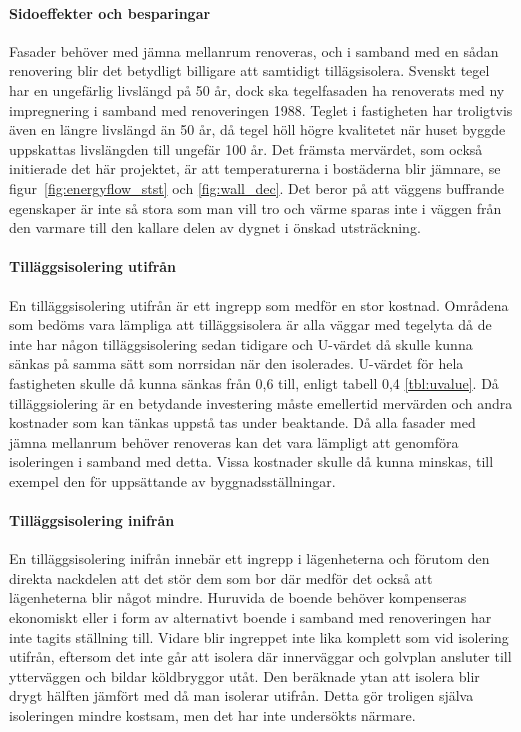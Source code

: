 \paragraph{Sidoeffekter och besparingar}
Fasader behöver med jämna mellanrum renoveras, och i samband med en sådan renovering blir det betydligt billigare att samtidigt tillägsisolera. Svenskt tegel har en ungefärlig livslängd på 50 år\cite{magnus}, dock ska tegelfasaden ha renoverats med ny impregnering i samband med renoveringen 1988. Teglet i fastigheten har troligtvis även en längre livslängd än 50 år,  då tegel höll högre kvalitetet när huset byggde uppskattas livslängden till ungefär 100 år.
Det främsta mervärdet, som också initierade det här projektet, är att temperaturerna i bostäderna blir jämnare, se figur~\ref{fig:energyflow_stst} och \ref{fig:wall_dec}. 
Det beror på att väggens buffrande egenskaper är inte så stora som man vill tro och värme sparas inte i väggen från den varmare till den kallare delen av dygnet i önskad utsträckning.

\paragraph{Tilläggsisolering utifrån}
En tilläggsisolering utifrån är ett ingrepp som medför en stor kostnad. Områdena som bedöms vara lämpliga att tilläggsisolera är alla väggar med tegelyta då de inte har någon tilläggsisolering sedan tidigare och U-värdet då skulle kunna sänkas på samma sätt som norrsidan när den isolerades. U-värdet för hela fastigheten skulle då kunna sänkas från 0,6 till, enligt tabell 0,4 \ref{tbl:uvalue}. Då tilläggsiolering är en betydande investering måste emellertid mervärden och andra kostnader som kan tänkas uppstå tas under beaktande. Då alla fasader med jämna mellanrum behöver renoveras kan det vara lämpligt att genomföra isoleringen i samband med detta. Vissa kostnader skulle då kunna minskas, till exempel den för uppsättande av byggnadsställningar.

\paragraph{Tilläggsisolering inifrån}
En tilläggsisolering inifrån innebär ett ingrepp i lägenheterna och förutom den direkta nackdelen att det stör dem som bor där medför det också att lägenheterna blir något mindre. Huruvida de boende behöver kompenseras ekonomiskt eller i form av alternativt boende i samband med renoveringen har inte tagits ställning till. Vidare blir ingreppet inte lika komplett som vid isolering utifrån, eftersom det inte går att isolera där innerväggar och golvplan ansluter till ytterväggen och bildar köldbryggor utåt. Den beräknade ytan att isolera blir drygt hälften jämfört med då man isolerar utifrån. Detta gör troligen själva isoleringen mindre kostsam, men det har inte undersökts närmare.

